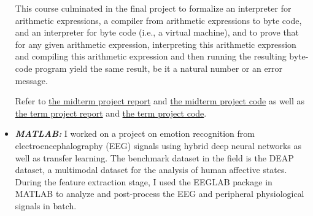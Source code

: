 \documentclass[11pt,reqno,oneside,a4paper]{article}
\begin{document}
\begin{itemize}
	This course culminated in the final project to formalize an interpreter for arithmetic expressions, a compiler from arithmetic expressions to byte code, and an interpreter for byte code (i.e., a virtual machine), and to prove that for any given arithmetic expression, interpreting this arithmetic expression and compiling this arithmetic expression and then running the resulting byte-code program yield the same result, be it a natural number or an error message. 
	
	Refer to \href{https://github.com/zhangliu6/course-submissions/blob/main/FPP_Midterm%20(4).pdf}{the midterm project report} and \href{https://github.com/zhangliu6/course-submissions/blob/main/midterm-project-liu-new.v}{the midterm project code} as well as \href{https://github.com/zhangliu6/course-submissions/blob/main/FPP_Term_Project_Report.pdf}{the term project report} and \href{https://github.com/zhangliu6/course-submissions/blob/main/term-project-liu-1.v}{the term project code}.
		
	\item \emph{\textbf{MATLAB: }}
	I worked on a project on emotion recognition from electroencephalography (EEG) signals using hybrid deep neural networks as well as transfer learning. The benchmark dataset in the field is the DEAP dataset, a multimodal dataset for the analysis of human affective states. During the feature extraction stage, I used the EEGLAB package in MATLAB to analyze and post-process the EEG and peripheral physiological signals in batch. 
\end{itemize}

{\small}
\end{document}
